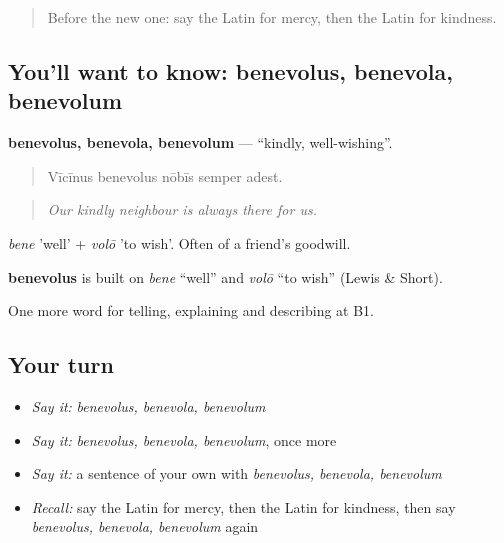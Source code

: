 \label{lesson:LA-C505-benevolus}



\begin{quote}
Before the new one: say the Latin for mercy, then the Latin for kindness.
\end{quote}

\subsection*{You'll want to know: benevolus, benevola, benevolum}
\textbf{benevolus, benevola, benevolum} — \textquotedblleft{}kindly, well-wishing\textquotedblright{}.

\begin{quote}
Vīcīnus benevolus nōbīs semper adest.
\end{quote}

\begin{quote}
\emph{Our kindly neighbour is always there for us.}
\end{quote}

\emph{bene} 'well' + \emph{volō} 'to wish'. Often of a friend's goodwill.

\begin{cousinweb}
\textbf{benevolus} is built on \emph{bene} \textquotedblleft{}well\textquotedblright{} and \emph{volō} \textquotedblleft{}to wish\textquotedblright{} (Lewis \& Short).
\end{cousinweb}

\begin{grammarlens}[title={What you've built}]
One more word for telling, explaining and describing at B1.
\end{grammarlens}

\subsection*{Your turn}
\begin{itemize}
\raggedright
  \item \emph{Say it:} \emph{benevolus, benevola, benevolum}
  \item \emph{Say it:} \emph{benevolus, benevola, benevolum}, once more
  \item \emph{Say it:} a sentence of your own with \emph{benevolus, benevola, benevolum}
  \item \emph{Recall:} say the Latin for mercy, then the Latin for kindness, then say \emph{benevolus, benevola, benevolum} again
\end{itemize}

